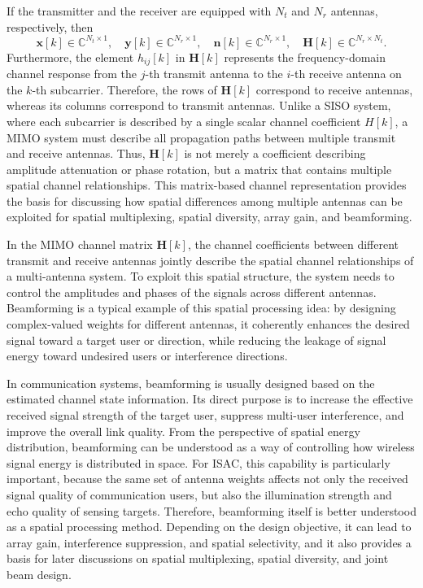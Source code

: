 If the transmitter and the receiver are equipped with \(N_t\) and \(N_r\) antennas, respectively,
then
\[
\mathbf{x}[k]\in\mathbb{C}^{N_t\times 1},
\quad
\mathbf{y}[k]\in\mathbb{C}^{N_r\times 1},
\quad
\mathbf{n}[k]\in\mathbb{C}^{N_r\times 1},
\quad
\mathbf{H}[k]\in\mathbb{C}^{N_r\times N_t}.
\]
Furthermore,
the element \(h_{ij}[k]\) in \(\mathbf{H}[k]\) represents the frequency-domain channel response
from the \(j\)-th transmit antenna to the \(i\)-th receive antenna on the \(k\)-th subcarrier.
Therefore,
the rows of \(\mathbf{H}[k]\) correspond to receive antennas,
whereas its columns correspond to transmit antennas.
Unlike a SISO system,
where each subcarrier is described by a single scalar channel coefficient \(H[k]\),
a MIMO system must describe all propagation paths between multiple transmit and receive antennas.
Thus,
\(\mathbf{H}[k]\) is not merely a coefficient describing amplitude attenuation or phase rotation,
but a matrix that contains multiple spatial channel relationships.
This matrix-based channel representation provides the basis for discussing how spatial differences among multiple antennas
can be exploited for spatial multiplexing,
spatial diversity,
array gain,
and beamforming.

In the MIMO channel matrix \(\mathbf{H}[k]\),
the channel coefficients between different transmit and receive antennas jointly describe
the spatial channel relationships of a multi-antenna system.
To exploit this spatial structure,
the system needs to control the amplitudes and phases of the signals across different antennas.
Beamforming is a typical example of this spatial processing idea:
by designing complex-valued weights for different antennas,
it coherently enhances the desired signal toward a target user or direction,
while reducing the leakage of signal energy toward undesired users or interference directions.

In communication systems,
beamforming is usually designed based on the estimated channel state information.
Its direct purpose is to increase the effective received signal strength of the target user,
suppress multi-user interference,
and improve the overall link quality.
From the perspective of spatial energy distribution,
beamforming can be understood as a way of controlling how wireless signal energy is distributed in space.
For ISAC,
this capability is particularly important,
because the same set of antenna weights affects not only the received signal quality of communication users,
but also the illumination strength and echo quality of sensing targets.
Therefore,
beamforming itself is better understood as a spatial processing method.
Depending on the design objective,
it can lead to array gain,
interference suppression,
and spatial selectivity,
and it also provides a basis for later discussions on spatial multiplexing,
spatial diversity,
and joint beam design. 

